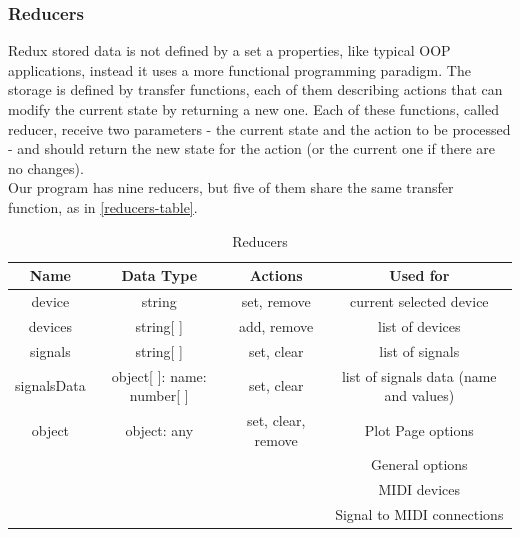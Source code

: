 \subsubsection{Reducers}
Redux stored data is not defined by a set a properties, like typical OOP applications,
instead it uses a more functional programming paradigm. The storage is defined by transfer
functions, each of them describing actions that can modify the current state by
returning a new one. Each of these functions, called reducer, receive two parameters -
the current state and the action to be processed - and should return the new state
for the action (or the current one if there are no changes). \\
Our program has nine reducers, but five of them share the same transfer function,
as in \autoref{reducers-table}.
\begin{table}[htb]
  \ABNTEXreducedfont
  \caption[Reducers]{Reducers}
  \label{reducers-table}
  \centering
  \begin{tabular}{c|c|c|c}
    \textbf{Name} & \textbf{Data Type} & \textbf{Actions} & \textbf{Used for} \\
		\hline \hline
		device & string & set, remove & current selected device \\
		\hline
		devices & string[ ] & add, remove & list of devices \\
		\hline
		signals & string[ ] & set, clear & list of signals \\
		\hline
		signalsData & object[ ]: {name: number[ ]} & set, clear & list of signals data (name and values) \\
		\hline
		object & object: any & set, clear, remove & Plot Page options \\
																					& & & General options \\
																					& & & MIDI devices \\
																					& & & Signal to MIDI connections \\

  \end{tabular}
\end{table}

